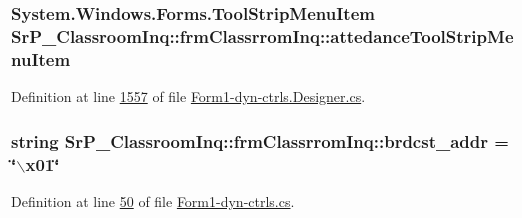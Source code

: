 \hypertarget{class_sr_p___classroom_inq_1_1frm_classrrom_inq_a2ccfb297c675044ba746ce9c6839c2bc}{
\subsubsection[{attedance\-Tool\-Strip\-Menu\-Item}]{\setlength{\rightskip}{0pt plus 5cm}\-System.\-Windows.\-Forms.\-Tool\-Strip\-Menu\-Item {\bf \-Sr\-P\-\_\-\-Classroom\-Inq\-::frm\-Classrrom\-Inq\-::attedance\-Tool\-Strip\-Menu\-Item}}}
\label{class_sr_p___classroom_inq_1_1frm_classrrom_inq_a2ccfb297c675044ba746ce9c6839c2bc}


\-Definition at line \hyperlink{_form1-dyn-ctrls_8_designer_8cs_source_l01557}{1557} of file \hyperlink{_form1-dyn-ctrls_8_designer_8cs_source}{\-Form1-\/dyn-\/ctrls.\-Designer.\-cs}.

\hypertarget{class_sr_p___classroom_inq_1_1frm_classrrom_inq_a1d96e40e37aca536a94b7107df4a2d71}{
\subsubsection[{brdcst\-\_\-addr}]{\setlength{\rightskip}{0pt plus 5cm}string {\bf \-Sr\-P\-\_\-\-Classroom\-Inq\-::frm\-Classrrom\-Inq\-::brdcst\-\_\-addr} = \char`\"{}$\backslash$x01\char`\"{}}}
\label{class_sr_p___classroom_inq_1_1frm_classrrom_inq_a1d96e40e37aca536a94b7107df4a2d71}


\-Definition at line \hyperlink{_form1-dyn-ctrls_8cs_source_l00050}{50} of file \hyperlink{_form1-dyn-ctrls_8cs_source}{\-Form1-\/dyn-\/ctrls.\-cs}.

